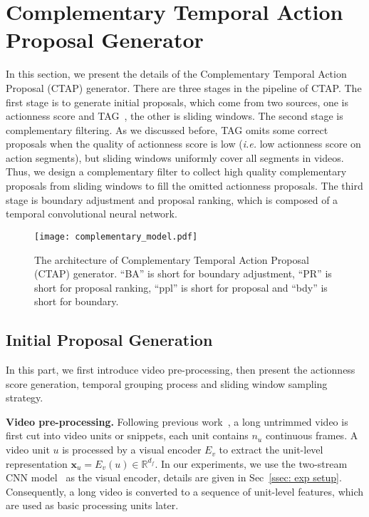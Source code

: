 \documentclass[runningheads]{llncs}
\begin{document}
\section{Complementary Temporal Action Proposal Generator}\label{sec: method}
In this section, we present the details of the Complementary Temporal Action Proposal (CTAP) generator. There are three stages in the pipeline of CTAP. The first stage is to generate initial proposals, which come from two sources, one is actionness score and TAG~\cite{Zhao_2017_ICCV}, the other is sliding windows. The second stage is complementary filtering. As we discussed before, TAG omits some correct proposals when the quality of actionness score is low (\emph{i.e.} low actionness score on action segments), but sliding windows uniformly cover all segments in videos. Thus, we design a complementary filter to collect high quality complementary proposals from sliding windows to fill the omitted actionness proposals. The third stage is boundary adjustment and proposal ranking, which is composed of a temporal convolutional neural network.



\begin{figure}[t]
  \centering
    \texttt{[image: complementary\_model.pdf]}
    \caption{The architecture of Complementary Temporal Action Proposal (CTAP) generator. ``BA'' is short for boundary adjustment, ``PR'' is short for proposal ranking, ``ppl'' is short for proposal and ``bdy'' is short for boundary.}
      \label{fig: model}
\end{figure}

\subsection{Initial Proposal Generation}
In this part, we first introduce video pre-processing, then present the actionness score generation, temporal grouping process and sliding window sampling strategy. 

\textbf{Video pre-processing.} Following previous work~\cite{Gao_2017_ICCV}, a long untrimmed video is first cut into video units or snippets, each unit contains $n_u$ continuous frames. A video unit $u$ is processed by a visual encoder $E_v$ to extract the unit-level representation $\mathbf{x}_u=E_v(u)\in\mathbb{R}^{d_f}$. In our experiments, we use the two-stream CNN model~\cite{simonyan2014two,xiong2016cuhk} as the visual encoder, details are given in Sec~\ref{ssec: exp setup}. Consequently, a long video is converted to a sequence of unit-level features, which are used as basic processing units later.
\end{document}
